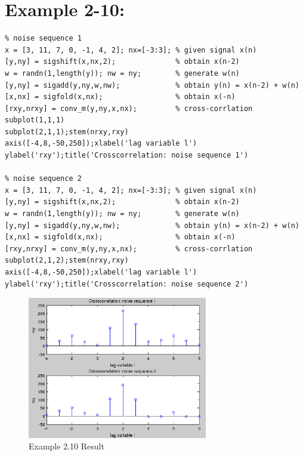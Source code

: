\documentclass[11pt
  , a4paper
  , article
  , oneside
]{memoir}
\begin{document}
\clearpage

\chapter{Example 2-10:}

\begin{lstlisting}[style=termstyle]
% Example 2.10
% noise sequence 1
x = [3, 11, 7, 0, -1, 4, 2]; nx=[-3:3]; % given signal x(n)
[y,ny] = sigshift(x,nx,2);              % obtain x(n-2)
w = randn(1,length(y)); nw = ny;        % generate w(n)
[y,ny] = sigadd(y,ny,w,nw);             % obtain y(n) = x(n-2) + w(n)
[x,nx] = sigfold(x,nx);                 % obtain x(-n)
[rxy,nrxy] = conv_m(y,ny,x,nx);         % cross-corrlation
subplot(1,1,1)
subplot(2,1,1);stem(nrxy,rxy)
axis([-4,8,-50,250]);xlabel('lag variable l')
ylabel('rxy');title('Crosscorrelation: noise sequence 1')

% noise sequence 2
x = [3, 11, 7, 0, -1, 4, 2]; nx=[-3:3]; % given signal x(n)
[y,ny] = sigshift(x,nx,2);              % obtain x(n-2)
w = randn(1,length(y)); nw = ny;        % generate w(n)
[y,ny] = sigadd(y,ny,w,nw);             % obtain y(n) = x(n-2) + w(n)
[x,nx] = sigfold(x,nx);                 % obtain x(-n)
[rxy,nrxy] = conv_m(y,ny,x,nx);         % cross-corrlation
subplot(2,1,2);stem(nrxy,rxy)
axis([-4,8,-50,250]);xlabel('lag variable l')
ylabel('rxy');title('Crosscorrelation: noise sequence 2')
\end{lstlisting}

\begin{figure}[h!]
	\centering
	\includegraphics[width=0.7\textwidth,height=0.5\textwidth]{./images/ex210.png}
	\caption{Example 2.10 Result}
	\label{fig:Example 2.10 Result}
\end{figure}

\clearpage
\end{document}
